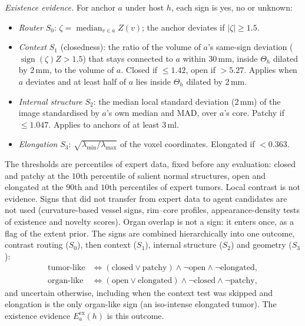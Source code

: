 \documentclass[fleqn,10pt]{olplainarticle}
\begin{document}
\emph{Existence evidence.} For anchor $a$ under host $h$, each sign is yes, no or unknown:
\begin{itemize}
\item \emph{Router} $S_0$: $\zeta=\operatorname{median}_{v\in a}Z(v)$; the anchor deviates if $|\zeta|\ge1.5$.
\item \emph{Context} $S_1$ (closedness): the ratio of the volume of $a$'s same-sign deviation ($\operatorname{sign}(\zeta)Z>1.5$)
that stays connected to $a$ within $30$\,mm, inside $\Theta_h$ dilated by $2$\,mm, to the volume of $a$. Closed if
$\le1.42$, open if $>5.27$. Applies when $a$ deviates and at least half of $a$ lies inside $\Theta_h$ dilated by $2$\,mm.
\item \emph{Internal structure} $S_2$: the median local standard deviation ($2$\,mm) of the image standardised by $a$'s own
median and MAD, over $a$'s core. Patchy if $\le1.047$. Applies to anchors of at least $3$\,ml.
\item \emph{Elongation} $S_3$: $\sqrt{\lambda_{\min}/\lambda_{\max}}$ of the voxel coordinates. Elongated if $<0.363$.
\end{itemize}
The thresholds are percentiles of expert data, fixed before any evaluation: closed and patchy at the $10$th percentile of
salient normal structures, open and elongated at the $90$th and $10$th percentiles of expert tumors. Local contrast is not
evidence. Signs that did not transfer from expert data to agent candidates are not used (curvature-based vessel signs,
rim--core profiles, appearance-density tests of existence and novelty scores). Organ overlap is not a sign: it enters once,
as a flag of the extent prior. The signs are combined hierarchically into one outcome, contrast routing ($S_0$), then context
($S_1$), internal structure ($S_2$) and geometry ($S_3$):
\begin{equation}
\label{eq:tree}
\begin{aligned}
\text{tumor-like}&\iff(\text{closed}\vee\text{patchy})\wedge\neg\text{open}\wedge\neg\text{elongated},\\
\text{organ-like}&\iff(\text{open}\vee\text{elongated})\wedge\neg\text{closed}\wedge\neg\text{patchy},
\end{aligned}
\end{equation}
and uncertain otherwise, including when the context test was skipped and elongation is the only organ-like sign (an
iso-intense elongated tumor). The existence evidence $E^{\mathrm{ex}}_a(h)$ is this outcome.
\end{document}
